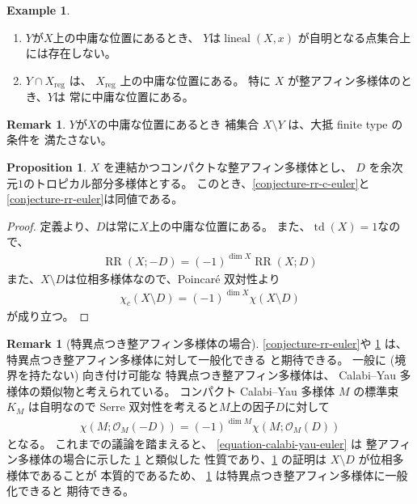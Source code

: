 \documentclass[a4paper,dvipdfmx,reqno,12pt]{amsart}
\theoremstyle{definition}
\newtheorem{example}[theorem]{Example}
\newtheorem{proposition}[theorem]{Proposition}
\newtheorem{remark}[theorem]{Remark}
\newcommand{\opn}[1]{\operatorname{#1}}
\numberwithin{equation}{section}
\begin{document}
\begin{example}
\begin{enumerate}
\item $Y$が$X$上の中庸な位置にあるとき、
$Y$は$\opn{lineal}(X,x)$
が自明となる点集合上には存在しない。
\item $Y\cap X_{\mathrm{reg}}$ は、
$X_{\mathrm{reg}}$ 上の中庸な位置にある。
特に $X$ が整アフィン多様体のとき、$Y$は
常に中庸な位置にある。
\end{enumerate}

\end{example}

\begin{remark}
$Y$が$X$の中庸な位置にあるとき
補集合 $X\setminus Y$ は、大抵 finite type の条件を
満たさない。
\end{remark}

\begin{proposition}
\label{proposition-divisor-poincare}
$X$ を連結かつコンパクトな整アフィン多様体とし、
$D$ を余次元$1$のトロピカル部分多様体とする。
このとき、\cref{conjecture-rr-c-euler}と
\cref{conjecture-rr-euler}は同値である。
\end{proposition}
\begin{proof}
定義より、$D$は常に$X$上の中庸な位置にある。
また、$\opn{td}(X)=1$なので、
\begin{align}
\opn{RR}(X;-D)=(-1)^{\dim X}\opn{RR}(X;D)
\end{align}
また、$X\setminus D$は位相多様体なので、Poincar\'e 双対性より
\begin{align}
\chi_c(X\setminus D)=(-1)^{\dim X}\chi(X\setminus D)
\end{align}
が成り立つ。
\end{proof}

\begin{remark}[{特異点つき整アフィン多様体の場合}]
\label{remark-iass}
\cref{conjecture-rr-euler}や
\cref{proposition-divisor-poincare}
は、特異点つき整アフィン多様体に対して一般化できる
と期待できる。
一般に (境界を持たない) 向き付け可能な
特異点つき整アフィン多様体は、
Calabi--Yau 多様体の類似物と考えられている。
コンパクト Calabi--Yau 多様体 $M$ の標準束
$K_M$ は自明なので
Serre 双対性を考えると$M$上の因子$D$に対して
\begin{align}
\label{equation-calabi-yau-euler}
\chi(M;\mathcal{O}_M(-D))=(-1)^{\dim M}
\chi(M;\mathcal{O}_{M}(D))
\end{align}
となる。
これまでの議論を踏まえると、
\cref{equation-calabi-yau-euler} は
整アフィン多様体の場合に示した
\cref{proposition-divisor-poincare} と類似した
性質であり、\cref{proposition-divisor-poincare}
の証明は $X\setminus D$ が位相多様体であることが
本質的であるため、
\cref{proposition-divisor-poincare}
は特異点つき整アフィン多様体に一般化できると
期待できる。
\end{remark}
\end{document}
